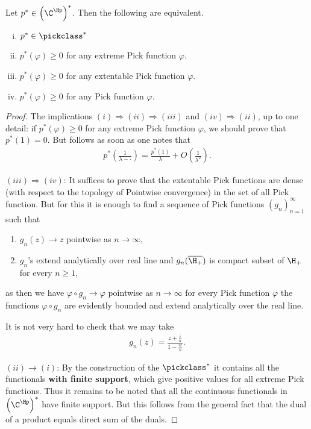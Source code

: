 \begin{lause}\label{pick_functionals}
	Let $p^{*} \in \left(\C^{\Hp}\right)^{*}$. Then the following are equivalent.
	\begin{enumerate}[(i)]
		\item $p^{*} \in \pickclass^{*}$
		\item $p^{*}(\varphi) \geq 0$ for any extreme Pick function $\varphi$.
		\item $p^{*}(\varphi) \geq 0$ for any extentable Pick function $\varphi$.
		\item $p^{*}(\varphi) \geq 0$ for any Pick function $\varphi$.
	\end{enumerate}
\end{lause}
\begin{proof}
	The implications $(i) \Rightarrow (ii) \Rightarrow (iii)$ and $(iv) \Rightarrow (ii)$, up to one detail: if $p^{*}(\varphi) \geq 0$ for any extreme Pick function $\varphi$, we should prove that $p^{*}(1) = 0$. But follows as soon as one notes that
	\begin{align*}
		p^{*}\left(\frac{1}{\lambda - \cdot}\right) = \frac{p^{*}\left(1\right)}{\lambda} + O\left(\frac{1}{\lambda^2}\right).
	\end{align*}

	$(iii) \Rightarrow (iv)$: It suffices to prove that the extentable Pick functions are dense (with respect to the topology of Pointwise convergence) in the set of all Pick function. But for this it is enough to find a sequence of Pick functions $(g_{n})_{n = 1}^{\infty}$ such that
	\begin{enumerate}
		\item $g_{n}(z) \to z$ pointwise as $n \to \infty$,
		\item $g_{n}$'s extend analytically over real line and $g_{n}(\overline{\H_{+}})$ is compact subset of $\H_{+}$ for every $n \geq 1$,
	\end{enumerate}
	as then we have $\varphi \circ g_{n} \to \varphi$ pointwise as $n \to \infty$ for every Pick function $\varphi$ the functions $\varphi \circ g_{n}$ are evidently bounded and extend analytically over the real line.

	It is not very hard to check that we may take
	\begin{align*}
		g_{n}(z) = \frac{z + \frac{i}{n}}{1 - \frac{i z}{n}}.
	\end{align*}

	$(ii) \rightarrow (i)$: By the construction of the $\pickclass^{*}$ it contains all the functionals \textbf{with finite support}, which give positive values for all extreme Pick functions. Thus it remains to be noted that all the continuous functionals in $\left(\C^{\Hp}\right)^{*}$ have finite support. But this follows from the general fact that the dual of a product equals direct sum of the duals.
\end{proof}

